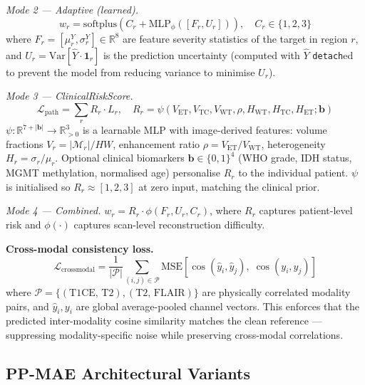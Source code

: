 \documentclass[runningheads]{llncs}
\begin{document}
\emph{Mode 2 — Adaptive (learned).}
\begin{equation}
w_r = \text{softplus}\!\left(C_r + \text{MLP}_\phi([F_r, U_r])\right),
\quad C_r \in \{1, 2, 3\}
\label{eq:adaptive}
\end{equation}
where $F_r = [\mu_r^Y, \sigma_r^Y] \in \mathbb{R}^{8}$ are feature
severity statistics of the target in region $r$, and
$U_r = \text{Var}[\hat{Y} \cdot \mathbf{1}_r]$ is the prediction
uncertainty (computed with $\hat{Y}$ \texttt{detach}ed to prevent
the model from reducing variance to minimise $U_r$).

\emph{Mode 3 — ClinicalRiskScore.}
\begin{equation}
\mathcal{L}_{\text{path}} = \sum_{r} R_r \cdot L_r, \quad
R_r = \psi(V_{\text{ET}}, V_{\text{TC}}, V_{\text{WT}},
           \rho, H_{\text{WT}}, H_{\text{TC}}, H_{\text{ET}}; \mathbf{b})
\label{eq:clinrisk}
\end{equation}
$\psi: \mathbb{R}^{7+|\mathbf{b}|} \rightarrow \mathbb{R}^3_{>0}$
is a learnable MLP with image-derived features:
volume fractions $V_r = |\mathcal{M}_r| / HW$,
enhancement ratio $\rho = V_{\text{ET}}/V_{\text{WT}}$,
heterogeneity $H_r = \sigma_r / \mu_r$.
Optional clinical biomarkers $\mathbf{b} \in \{0,1\}^4$
(WHO grade, IDH status, MGMT methylation, normalised age)
personalise $R_r$ to the individual patient.
$\psi$ is initialised so $R_r \approx [1, 2, 3]$ at zero input,
matching the clinical prior.

\emph{Mode 4 — Combined.}
$w_r = R_r \cdot \phi(F_r, U_r, C_r)$,
where $R_r$ captures patient-level risk and $\phi(\cdot)$ captures
scan-level reconstruction difficulty.

\textbf{Cross-modal consistency loss.}
\begin{equation}
\mathcal{L}_{\text{crossmodal}} = \frac{1}{|\mathcal{P}|}
\sum_{(i,j)\in\mathcal{P}} \text{MSE}\!\left[
  \cos(\hat{y}_i, \hat{y}_j),\; \cos(y_i, y_j)
\right]
\label{eq:crossmodal}
\end{equation}
where $\mathcal{P} = \{(\text{T1CE, T2}), (\text{T2, FLAIR})\}$ are
physically correlated modality pairs, and $\hat{y}_i, y_i$ are
global average-pooled channel vectors.
This enforces that the predicted inter-modality cosine similarity
matches the clean reference — suppressing modality-specific noise
while preserving cross-modal correlations.

\subsection{PP-MAE Architectural Variants}
\label{subsec:arch}
\end{document}
